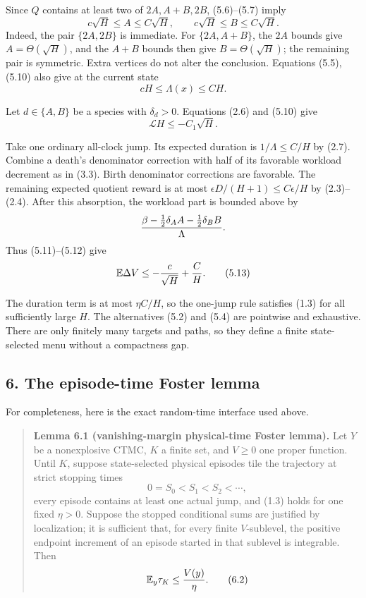 Since \(Q\) contains at least two of \(2A,A+B,2B\), (5.6)--(5.7) imply
\[
                c\sqrt H\le A\le C\sqrt H,\qquad
                c\sqrt H\le B\le C\sqrt H.             \tag{5.10}
\] Indeed, the pair \(\{2A,2B\}\) is immediate. For \(\{2A,A+B\}\), the
\(2A\) bounds give \(A=\Theta(\sqrt H)\), and the \(A+B\) bounds then
give \(B=\Theta(\sqrt H)\); the remaining pair is symmetric. Extra
vertices do not alter the conclusion. Equations (5.5),(5.10) also give
at the current state \[
                              cH\le\Lambda(x)\le CH.    \tag{5.11}
\]

Let \(d\in\{A,B\}\) be a species with \(\delta_d>0\). Equations (2.6)
and (5.10) give \[
                           \mathcal LH\le-C_1\sqrt H.   \tag{5.12}
\]

Take one ordinary all-clock jump. Its expected duration is
\(1/\Lambda\le C/H\) by (2.7). Combine a death's denominator correction
with half of its favorable workload decrement as in (3.3). Birth
denominator corrections are favorable. The remaining expected quotient
reward is at most \(\epsilon D/(H+1)\le C\epsilon/H\) by (2.3)--(2.4).
After this absorption, the workload part is bounded above by \[
              {\beta-\tfrac12\delta_AA-\tfrac12\delta_BB\over\Lambda}.
\] Thus (5.11)--(5.12) give \[
                           \mathbb E\Delta V
                              \le-{c\over\sqrt H}+{C\over H}. \tag{5.13}
\]

The duration term is at most \(\eta C/H\), so the one-jump rule
satisfies (1.3) for all sufficiently large \(H\). The alternatives (5.2)
and (5.4) are pointwise and exhaustive. There are only finitely many
targets and paths, so they define a finite state-selected menu without a
compactness gap.

\subsection{6. The episode-time Foster
lemma}

For completeness, here is the exact random-time interface used above.

\begin{quote}
\textbf{Lemma 6.1 (vanishing-margin physical-time Foster lemma).} Let
\(Y\) be a nonexplosive CTMC, \(K\) a finite set, and \(V\ge0\) one
proper function. Until \(K\), suppose state-selected physical episodes
tile the trajectory at strict stopping times \[
                 0=S_0<S_1<S_2<\cdots,              \tag{6.1}
\] every episode contains at least one actual jump, and (1.3) holds for
one fixed \(\eta>0\). Suppose the stopped conditional sums are justified
by localization; it is sufficient that, for every finite \(V\)-sublevel,
the positive endpoint increment of an episode started in that sublevel
is integrable. Then \[
                             \mathbb E_y\tau_K\le {V(y)\over\eta}. \tag{6.2}
\]
\end{quote}

